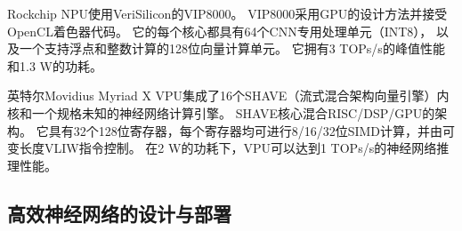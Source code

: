 Rockchip NPU\cite{rk3399pro}使用VeriSilicon的VIP8000。
VIP8000采用GPU的设计方法并接受OpenCL着色器代码。
它的每个核心都具有64个CNN专用处理单元（INT8），
以及一个支持浮点和整数计算的128位向量计算单元。
它拥有3 TOPs/s的峰值性能和1.3 W的功耗。

英特尔Movidius Myriad X VPU集成了16个SHAVE（流式混合架构向量引擎）内核和一个规格未知的神经网络计算引擎。
SHAVE核心\cite{shave}混合RISC/DSP/GPU的架构。
它具有32个128位寄存器，每个寄存器均可进行8/16/32位SIMD计算，并由可变长度VLIW指令控制。
在2 W的功耗下，VPU可以达到1 TOPs/s的神经网络推理性能。

\subsection{高效神经网络的设计与部署}
